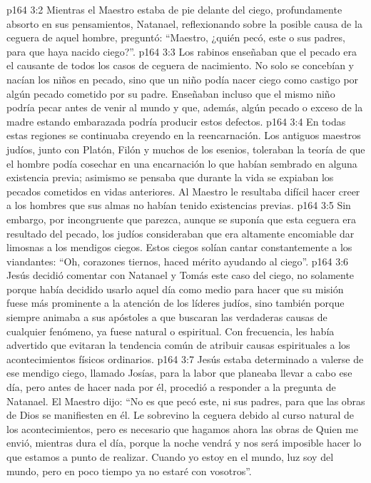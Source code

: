 \vs p164 3:2 Mientras el Maestro estaba de pie delante del ciego, profundamente absorto en sus pensamientos, Natanael, reflexionando sobre la posible causa de la ceguera de aquel hombre, preguntó: “Maestro, ¿quién pecó, este o sus padres, para que haya nacido ciego?”.
\vs p164 3:3 \pc Los rabinos enseñaban que el pecado era el causante de todos los casos de ceguera de nacimiento. No solo se concebían y nacían los niños en pecado, sino que un niño podía nacer ciego como castigo por algún pecado cometido por su padre. Enseñaban incluso que el mismo niño podría pecar antes de venir al mundo y que, además, algún pecado o exceso de la madre estando embarazada podría producir estos defectos.
\vs p164 3:4 En todas estas regiones se continuaba creyendo en la reencarnación. Los antiguos maestros judíos, junto con Platón, Filón y muchos de los esenios, toleraban la teoría de que el hombre podía cosechar en una encarnación lo que habían sembrado en alguna existencia previa; asimismo se pensaba que durante la vida se expiaban los pecados cometidos en vidas anteriores. Al Maestro le resultaba difícil hacer creer a los hombres que sus almas no habían tenido existencias previas.
\vs p164 3:5 Sin embargo, por incongruente que parezca, aunque se suponía que esta ceguera era resultado del pecado, los judíos consideraban que era altamente encomiable dar limosnas a los mendigos ciegos. Estos ciegos solían cantar constantemente a los viandantes: “Oh, corazones tiernos, haced mérito ayudando al ciego”.
\vs p164 3:6 \pc Jesús decidió comentar con Natanael y Tomás este caso del ciego, no solamente porque había decidido usarlo aquel día como medio para hacer que su misión fuese más prominente a la atención de los líderes judíos, sino también porque siempre animaba a sus apóstoles a que buscaran las verdaderas causas de cualquier fenómeno, ya fuese natural o espiritual. Con frecuencia, les había advertido que evitaran la tendencia común de atribuir causas espirituales a los acontecimientos físicos ordinarios.
\vs p164 3:7 Jesús estaba determinado a valerse de ese mendigo ciego, llamado Josías, para la labor que planeaba llevar a cabo ese día, pero antes de hacer nada por él, procedió a responder a la pregunta de Natanael. El Maestro dijo: “No es que pecó este, ni sus padres, para que las obras de Dios se manifiesten en él. Le sobrevino la ceguera debido al curso natural de los acontecimientos, pero es necesario que hagamos ahora las obras de Quien me envió, mientras dura el día, porque la noche vendrá y nos será imposible hacer lo que estamos a punto de realizar. Cuando yo estoy en el mundo, luz soy del mundo, pero en poco tiempo ya no estaré con vosotros”.
